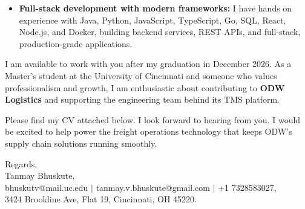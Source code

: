 \documentclass[11pt]{letter}
\begin{document}
\begin{letter}{}
\begin{itemize}[leftmargin=*, itemsep=0.45em]
    \item \textbf{Full-stack development with modern frameworks:} I have hands on experience with Java, Python, JavaScript, TypeScript, Go, SQL, React, Node.js, and Docker, building backend services, REST APIs, and full-stack, production-grade applications.
\end{itemize}

I am available to work with you after my graduation in December 2026. As a Master's student at the University of Cincinnati and someone who values professionalism and growth, I am enthusiastic about contributing to \textbf{ODW Logistics} and supporting the engineering team behind its TMS platform.

Please find my CV attached below. I look forward to hearing from you. I would be excited to help power the freight operations technology that keeps ODW's supply chain solutions running smoothly.

{\setlength{\parskip}{0pt}
Regards,\\
Tanmay Bhuskute,\\
bhuskutv@mail.uc.edu $\mid$ tanmay.v.bhuskute@gmail.com $\mid$ +1 7328583027,\\
3424 Brookline Ave, Flat 19, Cincinnati, OH 45220.
}

\end{letter}
\end{document}
